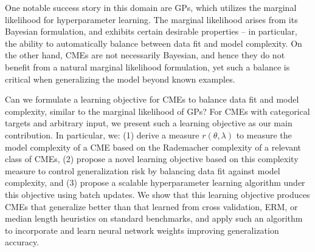 \documentclass[twoside]{article}
\begin{document}
		
		One notable success story in this domain are \gls{GPs}, which utilizes the marginal likelihood for hyperparameter learning. The marginal likelihood arises from its Bayesian formulation, and exhibits certain desirable properties -- in particular, the ability to automatically balance between data fit and model complexity. On the other hand, \glspl{CME} are not necessarily Bayesian, and hence they do not benefit from a natural marginal likelihood formulation, yet such a balance is critical when generalizing the model beyond known examples.
		
		
		Can we formulate a learning objective for \glspl{CME} to balance data fit and model complexity, similar to the marginal likelihood of \gls{GPs}? For \glspl{CME} with categorical targets and arbitrary input, we present such a learning objective as our main contribution. In particular, we: (1) derive a measure $r(\theta, \lambda)$ to measure the model complexity of a \gls{CME} based on the Rademacher complexity of a relevant class of \glspl{CME}, (2) propose a novel learning objective based on this complexity measure to control generalization risk by balancing data fit against model complexity, and (3) propose a scalable hyperparameter learning algorithm under this objective using batch updates. We show that this learning objective produces \glspl{CME} that generalize better than that learned from cross validation, \gls{ERM}, or median length heuristics on standard benchmarks, and apply such an algorithm to incorporate and learn neural network weights improving generalization accuracy. %
		
		
		
\end{document}
